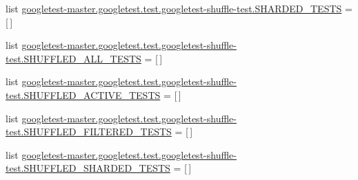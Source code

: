 \begin{DoxyCompactItemize}
\item 
list \mbox{\hyperlink{namespacegoogletest-master_1_1googletest_1_1test_1_1googletest-shuffle-test_a70f99a6a9f2bbcddc0aae4e63a3e56b7}{googletest-\/master.\+googletest.\+test.\+googletest-\/shuffle-\/test.\+S\+H\+A\+R\+D\+E\+D\+\_\+\+T\+E\+S\+TS}} = \mbox{[}$\,$\mbox{]}
\item 
list \mbox{\hyperlink{namespacegoogletest-master_1_1googletest_1_1test_1_1googletest-shuffle-test_af3f16e8de0846ddf4fec1b2bbe249879}{googletest-\/master.\+googletest.\+test.\+googletest-\/shuffle-\/test.\+S\+H\+U\+F\+F\+L\+E\+D\+\_\+\+A\+L\+L\+\_\+\+T\+E\+S\+TS}} = \mbox{[}$\,$\mbox{]}
\item 
list \mbox{\hyperlink{namespacegoogletest-master_1_1googletest_1_1test_1_1googletest-shuffle-test_aec191581c999edef237a888838abe58d}{googletest-\/master.\+googletest.\+test.\+googletest-\/shuffle-\/test.\+S\+H\+U\+F\+F\+L\+E\+D\+\_\+\+A\+C\+T\+I\+V\+E\+\_\+\+T\+E\+S\+TS}} = \mbox{[}$\,$\mbox{]}
\item 
list \mbox{\hyperlink{namespacegoogletest-master_1_1googletest_1_1test_1_1googletest-shuffle-test_af7154494c4ded8c6eefaab15bd5c7ff6}{googletest-\/master.\+googletest.\+test.\+googletest-\/shuffle-\/test.\+S\+H\+U\+F\+F\+L\+E\+D\+\_\+\+F\+I\+L\+T\+E\+R\+E\+D\+\_\+\+T\+E\+S\+TS}} = \mbox{[}$\,$\mbox{]}
\item 
list \mbox{\hyperlink{namespacegoogletest-master_1_1googletest_1_1test_1_1googletest-shuffle-test_a7c8b7f426b35ed6209d606deccad850c}{googletest-\/master.\+googletest.\+test.\+googletest-\/shuffle-\/test.\+S\+H\+U\+F\+F\+L\+E\+D\+\_\+\+S\+H\+A\+R\+D\+E\+D\+\_\+\+T\+E\+S\+TS}} = \mbox{[}$\,$\mbox{]}
\end{DoxyCompactItemize}
